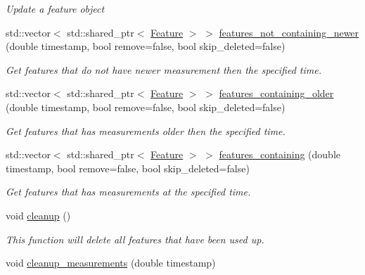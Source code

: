 \begin{DoxyCompactItemize}
\begin{DoxyCompactList}\small\item\em Update a feature object \end{DoxyCompactList}\item 
std\+::vector$<$ std\+::shared\+\_\+ptr$<$ \hyperlink{classov__core_1_1Feature}{Feature} $>$ $>$ \hyperlink{classov__core_1_1FeatureDatabase_a4f6d8da846e81eac1faa3c7abd7f44a7}{features\+\_\+not\+\_\+containing\+\_\+newer} (double timestamp, bool remove=false, bool skip\+\_\+deleted=false)
\begin{DoxyCompactList}\small\item\em Get features that do not have newer measurement then the specified time. \end{DoxyCompactList}\item 
std\+::vector$<$ std\+::shared\+\_\+ptr$<$ \hyperlink{classov__core_1_1Feature}{Feature} $>$ $>$ \hyperlink{classov__core_1_1FeatureDatabase_a5cdb62171c42c8787daec984a8cebe15}{features\+\_\+containing\+\_\+older} (double timestamp, bool remove=false, bool skip\+\_\+deleted=false)
\begin{DoxyCompactList}\small\item\em Get features that has measurements older then the specified time. \end{DoxyCompactList}\item 
std\+::vector$<$ std\+::shared\+\_\+ptr$<$ \hyperlink{classov__core_1_1Feature}{Feature} $>$ $>$ \hyperlink{classov__core_1_1FeatureDatabase_a144b59272688f0aeea0ecec6028dca04}{features\+\_\+containing} (double timestamp, bool remove=false, bool skip\+\_\+deleted=false)
\begin{DoxyCompactList}\small\item\em Get features that has measurements at the specified time. \end{DoxyCompactList}\item 
void \hyperlink{classov__core_1_1FeatureDatabase_abee9d8a5fa7fc4a97911058b6e8d10a0}{cleanup} ()
\begin{DoxyCompactList}\small\item\em This function will delete all features that have been used up. \end{DoxyCompactList}\item 
\mbox{\label{classov__core_1_1FeatureDatabase_a690e2279ff954a380036f6e69445fa16}} 
void \hyperlink{classov__core_1_1FeatureDatabase_a690e2279ff954a380036f6e69445fa16}{cleanup\+\_\+measurements} (double timestamp)

\end{DoxyCompactItemize}
